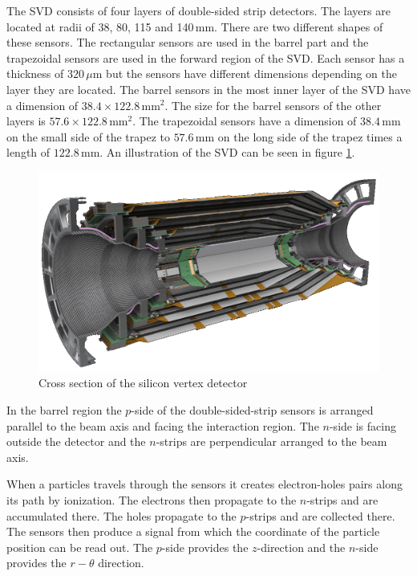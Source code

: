 \documentclass[a4paper,11pt,twosided,final,german,openbib,pdftex,listof=totoc,bibliography=totoc]{scrbook}
\begin{document}
The SVD consists of four layers of double-sided strip detectors. The layers are located at radii of 38, 80, 115 and 140$\,\textrm{mm}$. There are two different shapes of these sensors. The rectangular sensors are used in the barrel part and the trapezoidal sensors are used in the forward region of the SVD. Each sensor has a thickness of $320\,\mu\textrm{m}$ but the sensors have different dimensions depending on the layer they are located. The barrel sensors in the most inner layer of the SVD have a dimension of $38.4 \times 122.8\,\textrm{mm}^2$. The size for the barrel sensors of the other layers is $57.6 \times 122.8\,\textrm{mm}^2$. The trapezoidal sensors have a dimension of $38.4\,\textrm{mm}$ on the small side of the trapez to $57.6\,\textrm{mm}$ on the long side of the trapez times a length of $122.8\,\textrm{mm}$.\cite{B2TR} An illustration of the SVD can be seen in figure \ref{fig:SiliconVertex}. 

\begin{figure}[h!]
	\centering
	\includegraphics[width=\textwidth]{Bilder/SVD.png}
	\caption[Silicon Vertex Detector]{Cross section of the silicon vertex detector\cite{SVDItalian}}
	\label{fig:SiliconVertex}
\end{figure}

In the barrel region the $p$-side of the double-sided-strip sensors is arranged parallel to the beam axis and facing the interaction region. The $n$-side is facing outside the detector and the $n$-strips are perpendicular arranged to the beam axis. 

When a particles travels through the sensors it creates electron-holes pairs along its path by ionization. The electrons then propagate to the $n$-strips and are accumulated there. The holes propagate to the $p$-strips and are collected there. The sensors then produce a signal from which the coordinate of the particle position can be read out. The $p$-side provides the $z$-direction and the $n$-side provides the $r-\theta$ direction.\cite{B2TR} \cite{bergauer2010silicon}
\end{document}
